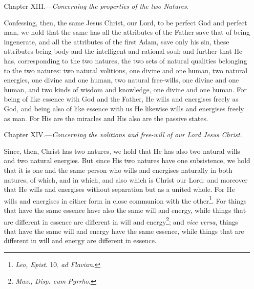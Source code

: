 
Chapter XIII.—\emph{Concerning the properties of the two Natures.}

Confessing, then, the same Jesus Christ, our Lord, to be perfect God and perfect man, we hold that the same has all the attributes of the Father save that of being ingenerate, and all the attributes of the first Adam, save only his sin, these attributes being body and the intelligent and rational soul; and further that He has, corresponding to the two natures, the two sets of natural qualities belonging to the two natures: two natural volitions, one divine and one human, two natural energies, one divine and one human, two natural free-wills, one divine and one human, and two kinds of wisdom and knowledge, one divine and one human. For being of like essence with God and the Father, He wills and energises freely as God, and being also of like essence with us He likewise wills and energises freely as man. For His are the miracles and His also are the passive states.


Chapter XIV.—\emph{Concerning the volitions and free-will of our Lord Jesus Christ.}

Since, then, Christ has two natures, we hold that He has also two natural wills and two natural energies. But since His two natures have one subsistence, we hold that it is one and the same person who wills and energises naturally in both natures, of which, and in which, and also which is Christ our Lord: and moreover that He wills and energises without separation but as a united whole. For He wills and energises in either form in close communion with the other\footnote{\emph{Leo, Epist. }10, \emph{ad Flavian}.}. For things that have the same essence have also the same will and energy, while things that are different in essence are different in will and energy\footnote{\emph{Max., Disp. cum Pyrrho}.}; and \emph{vice versa}, things that have the same will and energy have the same essence, while things that are different in will and energy are different in essence.

